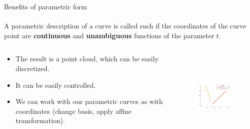 \documentclass[aspectratio=169]{beamer}
\begin{document}
\begin{frame}[t]{Benefits of parametric form}
\framesubtitle{}
    \begin{definition}
        A parametric description of a curve is called such if the coordinates of the curve point are \textbf{continuous} and \textbf{unambiguous} functions of the parameter $t$.
    \end{definition}
    \begin{columns}[T,onlytextwidth]
        \begin{column}{0.59\textwidth}
            \begin{itemize}
                \item The result is a point cloud, which can be easily discretized.
                \item It can be easily controlled.
                \item We can work with our parametric curves as with coordinates (change basis, apply affine transformation).
            \end{itemize}
        \end{column}
        \begin{column}{0.39\textwidth}
            \vspace{-0.9cm}
            \begin{figure}[H]
                \centering\includegraphics[height=4.6cm,width=1\textwidth,keepaspectratio]{line_example.png}
                \label{fig:line_example.png}
            \end{figure}
        \end{column}
    \end{columns}

\end{frame}
\end{document}
